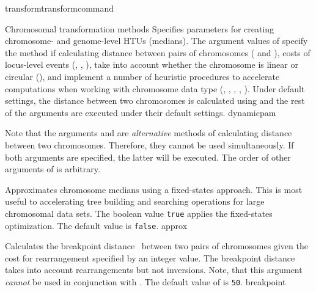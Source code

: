 \begin{command}{transform}{transformcommand}
\begin{arguments}
\begin{argumentgroup}{Chromosomal transformation methods}
            {Specifies parameters for creating chromosome- and genome-level HTUs (medians).
            The argument values of  specify the
            method if calculating distance between pairs of chromosomes
            ( and ), costs
            of locus-level events (, ,
            ), take into
            account whether the chromosome is linear or circular
            (), and implement a number of heuristic
            procedures to accelerate computations when working with chromosome
            data type (, ,
           , , ).
            Under default settings, the distance between two chromosomes is calculated using
             and the rest of the arguments are executed
            under their default settings.}
            {dynamicpam}
	
	\begin{statement}
  	Note that the arguments  and 
	are \emph{alternative} methods of calculating distance between two chromosomes.
	Therefore, they cannot be used simultaneously. If both arguments are specified,
	the latter will be executed. The order of other arguments of
	 is arbitrary. 
	\end{statement}
	
            \begin{description}
            
                        {Approximates chromosome medians using a fixed-states
                        approach. This is most useful to accelerating tree
                        building and searching operations for large chromosomal
                        data sets. The boolean value \texttt{true} applies the
                        fixed-states optimization. The default value is
                        \texttt{false}.}
                        {approx}
                    
                        {Calculates the breakpoint distance~\cite{blanchetteetal1997}
                        between two pairs
                        of chromosomes given the cost for rearrangement
                        specified by an integer value. The breakpoint distance
                        takes into account rearrangements but not inversions.
                        Note, that this argument \emph{cannot} be used in
                        conjunction with . The default
                        value of  is \texttt{50}.} 
                        {breakpoint}
                        

\end{description}
\end{argumentgroup}
\end{arguments}
\end{command}
